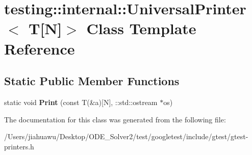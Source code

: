 \hypertarget{classtesting_1_1internal_1_1_universal_printer_3_01_t[_n]_4}{}\section{testing\+:\+:internal\+:\+:Universal\+Printer$<$ T\mbox{[}N\mbox{]}$>$ Class Template Reference}
\label{classtesting_1_1internal_1_1_universal_printer_3_01_t[_n]_4}
\subsection*{Static Public Member Functions}
\begin{DoxyCompactItemize}
\item 
\mbox{\label{classtesting_1_1internal_1_1_universal_printer_3_01_t[_n]_4_a1cf0e7c8db59c090f769116c6421b212}} 
static void {\bfseries Print} (const T(\&a)\mbox{[}N\mbox{]}, \+::std\+::ostream $\ast$os)
\end{DoxyCompactItemize}


The documentation for this class was generated from the following file\+:\begin{DoxyCompactItemize}
\item 
/\+Users/jiahuawu/\+Desktop/\+O\+D\+E\+\_\+\+Solver2/test/googletest/include/gtest/gtest-\/printers.\+h\end{DoxyCompactItemize}

